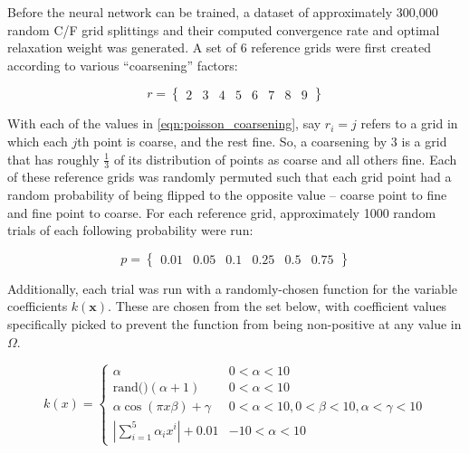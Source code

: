 \documentclass[review]{siamart190516}
\newcommand{\abs}[1]{\left\lvert#1\right\rvert}
\renewcommand{\vec}[1]{\bm{{#1}}}
\begin{document}
Before the neural network can be trained, a dataset of approximately 300,000 random C/F grid splittings and their computed convergence rate and optimal relaxation weight was generated.  A set of $6$ reference grids were first created according to various ``coarsening'' factors:

\begin{equation} \label{eqn:poisson_coarsening}
  r = \begin{Bmatrix} 2 & 3 & 4 & 5 & 6 & 7 & 8 & 9\end{Bmatrix}
\end{equation}

With each of the values in \ref{eqn:poisson_coarsening}, say $r_i = j$ refers to a grid in which each $j$th point is coarse, and the rest fine.  So, a coarsening by $3$ is a grid that has roughly $\frac{1}{3}$ of its distribution of points as coarse and all others fine.  Each of these reference grids was randomly permuted such that each grid point had a random probability of being flipped to the opposite value -- coarse point to fine and fine point to coarse.  For each reference grid, approximately 1000 random trials of each following probability were run:

\begin{equation} \label{eqn:poisson_probabilities}
  p = \begin{Bmatrix} 0.01 & 0.05 & 0.1 & 0.25 & 0.5 & 0.75 \end{Bmatrix}
\end{equation}

Additionally, each trial was run with a randomly-chosen function for the variable coefficients $k\left(\vec{x}\right)$.  These are chosen from the set below, with coefficient values specifically picked to prevent the function from being non-positive at any value in $\Omega$.

\begin{equation} \label{eqn:poisson_varcoefficients}
k\left(x\right) = \begin{cases}
\alpha & 0 < \alpha < 10 \\
\text{rand()}\left(\alpha + 1\right) & 0 < \alpha < 10 \\
\alpha\cos\left(\pi x \beta\right) + \gamma & 0 < \alpha < 10, 0 < \beta < 10, \alpha < \gamma < 10\\
\abs{\sum_{i=1}^5 \alpha_i x^i} + 0.01 & -10 < \alpha < 10
\end{cases}
\end{equation}
\end{document}
